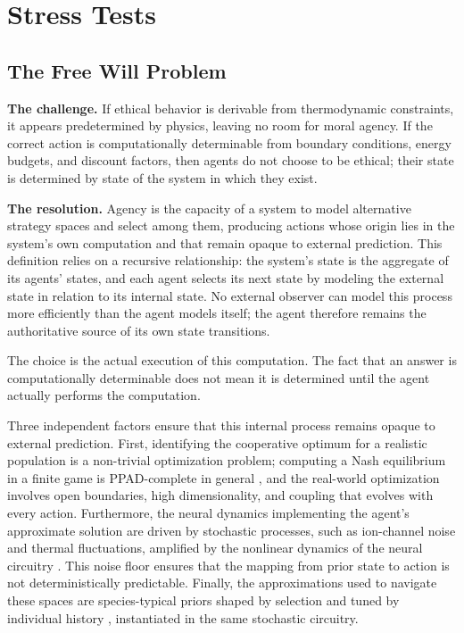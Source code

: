 \documentclass[11pt]{article}
\theoremstyle{plain}
\theoremstyle{definition}
\theoremstyle{remark}
\let\origsection\section
\renewcommand{\section}{\needspace{12\baselineskip}\origsection}
\let\origsubsection\subsection
\renewcommand{\subsection}{\needspace{7\baselineskip}\origsubsection}
\begin{document}
\section{Stress Tests}\label{stress-tests}

\subsection{The Free Will Problem}\label{the-free-will-problem}

\textbf{The challenge.} If ethical behavior is derivable from
thermodynamic constraints, it appears predetermined by physics, leaving
no room for moral agency. If the correct action is computationally
determinable from boundary conditions, energy budgets, and discount
factors, then agents do not choose to be ethical; their state is
determined by state of the system in which they exist.

\textbf{The resolution.} Agency is the capacity of a system to model
alternative strategy spaces and select among them, producing actions
whose origin lies in the system's own computation and that remain opaque
to external prediction. This definition relies on a recursive
relationship: the system's state is the aggregate of its agents' states,
and each agent selects its next state by modeling the external state in
relation to its internal state. No external observer can model this
process more efficiently than the agent models itself; the agent
therefore remains the authoritative source of its own state transitions.

The choice is the actual execution of this computation. The fact that an
answer is computationally determinable does not mean it is determined
until the agent actually performs the computation.

Three independent factors ensure that this internal process remains
opaque to external prediction. First, identifying the cooperative
optimum for a realistic population is a non-trivial optimization
problem; computing a Nash equilibrium in a finite game is PPAD-complete
in general \citep{Daskalakis2009}, and the real-world optimization
involves open boundaries, high dimensionality, and coupling that evolves
with every action. Furthermore, the neural dynamics implementing the
agent's approximate solution are driven by stochastic processes, such as
ion-channel noise and thermal fluctuations, amplified by the nonlinear
dynamics of the neural circuitry \citep{FaiSelWol2008}. This noise floor
ensures that the mapping from prior state to action is not
deterministically predictable. Finally, the approximations used to
navigate these spaces are species-typical priors shaped by selection and
tuned by individual history
\citep{CosmidesTooby1992, CosmidesTooby2013}, instantiated in the same
stochastic circuitry.
\end{document}
